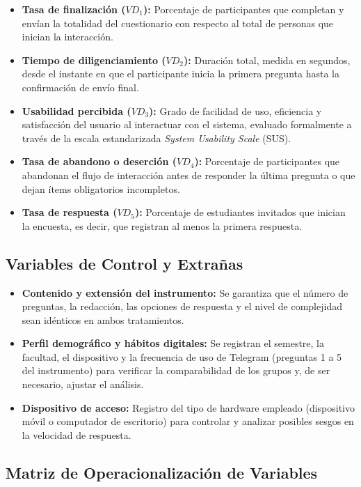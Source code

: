 \documentclass[12pt,letterpaper]{article}
\begin{document}
\begin{itemize}
    \item \textbf{Tasa de finalización ($VD_1$):} Porcentaje de participantes que completan y envían la totalidad del cuestionario con respecto al total de personas que inician la interacción.
    \item \textbf{Tiempo de diligenciamiento ($VD_2$):} Duración total, medida en segundos, desde el instante en que el participante inicia la primera pregunta hasta la confirmación de envío final.
    \item \textbf{Usabilidad percibida ($VD_3$):} Grado de facilidad de uso, eficiencia y satisfacción del usuario al interactuar con el sistema, evaluado formalmente a través de la escala estandarizada \textit{System Usability Scale} (SUS).
    \item \textbf{Tasa de abandono o deserción ($VD_4$):} Porcentaje de participantes que abandonan el flujo de interacción antes de responder la última pregunta o que dejan ítems obligatorios incompletos.
    \item \textbf{Tasa de respuesta ($VD_5$):} Porcentaje de estudiantes invitados que inician la encuesta, es decir, que registran al menos la primera respuesta.
\end{itemize}

\subsection{Variables de Control y Extrañas}

\begin{itemize}
    \item \textbf{Contenido y extensión del instrumento:} Se garantiza que el número de preguntas, la redacción, las opciones de respuesta y el nivel de complejidad sean idénticos en ambos tratamientos.
    \item \textbf{Perfil demográfico y hábitos digitales:} Se registran el semestre, la facultad, el dispositivo y la frecuencia de uso de Telegram (preguntas 1 a 5 del instrumento) para verificar la comparabilidad de los grupos y, de ser necesario, ajustar el análisis.
    \item \textbf{Dispositivo de acceso:} Registro del tipo de hardware empleado (dispositivo móvil o computador de escritorio) para controlar y analizar posibles sesgos en la velocidad de respuesta.
\end{itemize}

\subsection{Matriz de Operacionalización de Variables}
\end{document}
